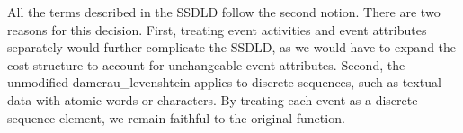 \documentclass[./../../paper.tex]{subfiles}
\begin{document}
All the terms described in the \gls{SSDLD} follow the second notion. There are two reasons for this decision. First, treating event activities and event attributes separately would further complicate the \gls{SSDLD}, as we would have to expand the cost structure to account for unchangeable event attributes. Second, the unmodified \gls{damerau_levenshtein} applies to discrete sequences, such as textual data with atomic words or characters. By treating each event as a discrete sequence element, we remain faithful to the original function. 
\end{document}
